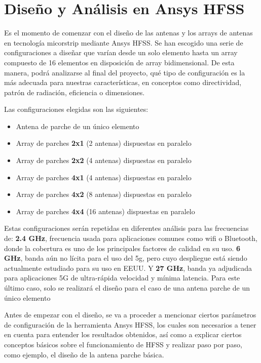 \section{Diseño y Análisis en Ansys HFSS}

\par Es el momento de comenzar con el diseño de las antenas y los arrays de antenas en tecnología micorstrip mediante Ansys HFSS. Se han escogido una serie de configuraciones a diseñar que varían desde un solo elemento hasta un array compuesto de 16 elementos en disposición de array bidimensional. De esta manera, podrá analizarse al final del proyecto, qué tipo de configuración es la más adecuada para nuestras características, en conceptos como directividad, patrón de radiación, eficiencia o dimensiones.
\\
\par Las configuraciones elegidas son las siguientes:

\begin{itemize}
\item Antena de parche de un único elemento
\item Array de parches \textbf{2x1} (2 antenas) dispuestas en paralelo
\item Array de parches \textbf{2x2} (4 antenas) dispuestas en paralelo
\item Array de parches \textbf{4x1} (4 antenas) dispuestas en paralelo
\item Array de parches \textbf{4x2} (8 antenas) dispuestas en paralelo
\item Array de parches \textbf{4x4} (16 antenas) dispuestas en paralelo
\end{itemize}

\par Estas configuraciones serán repetidas en diferentes análisis para las frecuencias de: \textbf{2.4 GHz}, frecuencia usada para aplicaciones comunes como \gls{wifi} o Bluetooth, donde la cobertura es uno de los principales factores de calidad en su uso. \textbf{6 GHz}, banda aún no lícita para el uso del \gls{5g}, pero cuyo despliegue está siendo actualmente estudiado para su uso en EEUU. Y \textbf{27 GHz}, banda ya adjudicada para aplicaciones 5G de ultra-rápida velocidad y mínima latencia. Para este último caso, solo se realizará el diseño para el caso de una antena parche de un único elemento 
\\
\par Antes de empezar con el diseño, se va a proceder a mencionar ciertos parámetros de configuración de la herramienta Ansys HFSS, los cuales son necesarios a tener en cuenta para entender los resultados obtenidos, así como a explicar ciertos conceptos básicos sobre el funcionamiento de HFSS y realizar paso por paso, como ejemplo, el diseño de la antena parche básica.

